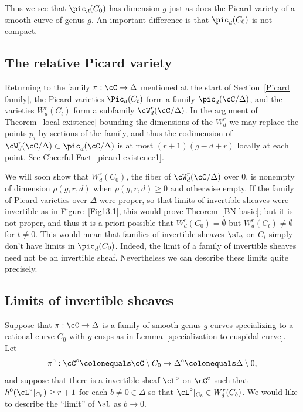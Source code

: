 Thus we see that $\pic_{d}(C_{0})$ has dimension $g$ just as does the
Picard variety
%
of a smooth curve
of genus $g$. An important difference is that $\pic_{d}(C_{0})$ is
not compact.

\subsection*{The relative Picard variety}

Returning to the family $\pi : \cC \to \Delta$ mentioned at the
start
%
of
Section~\ref{Picard family}, the Picard varieties $\Pic_d(C_t)$ form
a family $\pic_d(\cC/\Delta)$, and the varieties $W^r_d(C_t)$ form a
subfamily $\cW^r_d(\cC/\Delta)$.  In the argument
of Theorem~\ref{local existence} bounding  the dimensions of the $W^r_d$
we may replace the points $p_i$ by sections of the family, and thus
the codimension of $\cW^r_d(\cC/\Delta) \subset \pic_d(\cC/\Delta)$
is
at most
$(r+1)(g-d+r)$ locally at each point. See
Cheerful Fact~\ref{picard existence1}.

We will soon show that $W^{r}_{d}(C_{0})$, the fiber of
$\cW^{r}_{d}(\cC/\Delta)$ over 0,  is nonempty of dimension $\rho(g,r,d)$
when $\rho(g,r,d)\geq 0$ and otherwise empty. If the family of Picard
varieties over $\Delta$ were proper, so that limits of invertible sheaves
were invertible as in Figure~\ref{Fig13.1},
this would prove Theorem~\ref{BN-basic}; but it is not proper, and
thus it is a priori possible that $W^{r}_{d}(C_{0})=\emptyset$ but
$W^{r}_{d}(C_{t})\neq \emptyset$ for $t\neq 0$. This would mean that
families of invertible sheaves $\sL_{t}$ on $C_{t}$  simply don't
have  limits
in $\pic_{d}(C_{0})$. Indeed, the limit of a family of invertible sheaves
need not be an invertible
sheaf. Nevertheless we can describe these limits quite precisely.

\subsection*{Limits of invertible sheaves}

Suppose  that  $\pi : \cC \to \Delta$ is a family of smooth genus $g$
%
curves specializing to a rational curve $C_0$ with $g$ cusps as in
Lemma~\ref{specialization to cuspidal curve}.
 Let
$$
\pi^\circ: \cC^\circ \colonequals  \cC \setminus C_0\to \Delta^\circ
\colonequals  \Delta\setminus 0,
$$
and suppose that there is a invertible sheaf $\cL^\circ$ on $\cC^\circ$
such that $h^0(\cL^\circ|_{C_b}) \geq r+1$ for each $b \neq 0 \in \Delta$
so that $\cL^\circ|_{C_b}\in W^{r}_{d}(C_{b})$. We would like to describe
the ``limit'' of $\sL$ as $b \to 0$.


